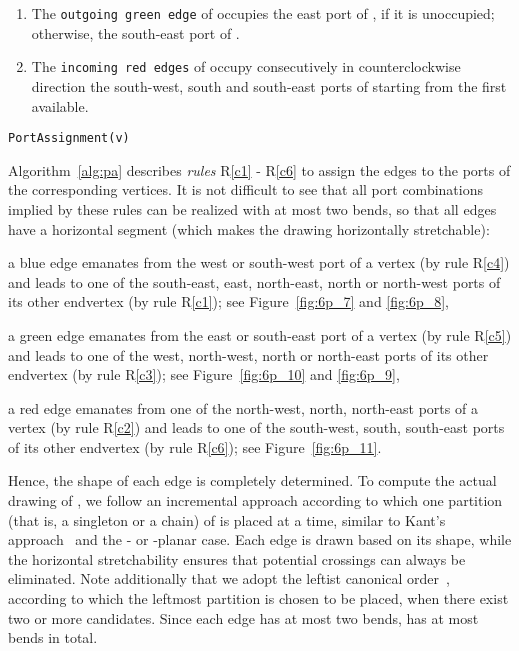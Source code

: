 \documentclass[a4paper,twoside,11pt]{article}
\begin{document}
\begin{algorithm}[t!]
\begin{enumerate}[{R}1:]
\medskip

\item \label{c5} The \texttt{outgoing green edge} of  occupies
the east port of , if it is unoccupied;\\otherwise, the
south-east port of .

\medskip

\item \label{c6} The \texttt{incoming red edges} of  occupy
consecutively in counterclockwise direction the south-west, south
and south-east ports of  starting from the first available.
\end{enumerate}
\caption{\texttt{PortAssignment(v)}} 
\label{alg:pa}
\end{algorithm}

Algorithm~\ref{alg:pa} describes \emph{rules} R\ref{c1} - R\ref{c6}
to assign the edges to the ports of the corresponding vertices. It
is not difficult to see that all port combinations implied by these
rules can be realized with at most two bends, so that all edges have
a horizontal segment (which makes the drawing horizontally
stretchable):
\begin{inparaenum}[(i)]
\item a blue edge emanates from the west or south-west port of a
vertex (by rule R\ref{c4}) and leads to one of the
south-east, east, north-east, north or north-west ports of its
other endvertex (by rule R\ref{c1}); see
Figure~\ref{fig:6p_7} and \ref{fig:6p_8},
\item a green edge emanates from the east or south-east port of a
vertex (by rule R\ref{c5}) and leads to one of the
west, north-west, north or north-east ports of its other endvertex
(by rule R\ref{c3}); see Figure~\ref{fig:6p_10} and
\ref{fig:6p_9},
\item a red edge emanates from one of the north-west, north,
north-east ports of a vertex (by rule R\ref{c2}) and
leads to one of the south-west, south, south-east ports of its
other endvertex (by rule R\ref{c6}); see
Figure~\ref{fig:6p_11}.
\end{inparaenum}

Hence, the shape of each edge is completely determined. To compute
the actual drawing  of , we follow an incremental
approach according to which one partition (that is, a singleton or a
chain) of  is placed at a time, similar to Kant's
approach~\cite{Kant92b} and the - or -planar case. Each edge is
drawn based on its shape, while the horizontal stretchability ensures
that potential crossings can always be eliminated.  Note additionally
that we adopt the leftist canonical order~\cite{BBC11}, according to
which the leftmost partition is chosen to be placed, when there exist
two or more candidates. Since each edge has at most two bends,
 has at most  bends in total.
\end{document}
